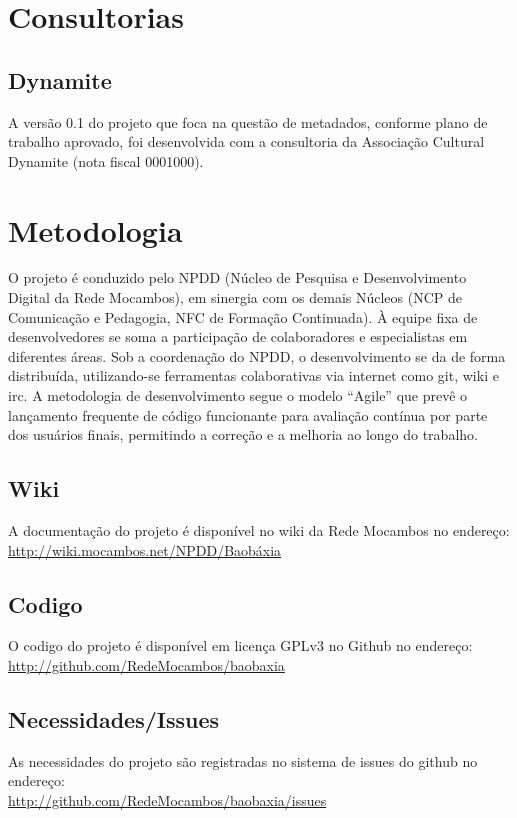 \section{Consultorias}
\subsection{Dynamite}
A versão 0.1 do projeto que foca na questão de metadados, conforme
plano de trabalho aprovado, foi desenvolvida com a consultoria da
Associação Cultural Dynamite (nota fiscal 0001000).


\section{Metodologia}
O projeto é conduzido pelo NPDD (Núcleo de Pesquisa e Desenvolvimento
Digital da Rede Mocambos), em sinergia com os demais Núcleos (NCP de
Comunicação e Pedagogia, NFC de Formação Continuada). À equipe fixa de
desenvolvedores se soma a participação de colaboradores e
especialistas em diferentes áreas. Sob a coordenação do NPDD, o
desenvolvimento se da de forma distribuída, utilizando-se ferramentas
colaborativas via internet como git, wiki e irc. A metodologia de
desenvolvimento segue o modelo ``Agile'' que prevê o lançamento
frequente de código funcionante para avaliação contínua por parte dos
usuários finais, permitindo a correção e a melhoria ao longo do
trabalho.

\subsection{Wiki}
A documentação do projeto é disponível no wiki da Rede Mocambos no
endereço: \\ \url{http://wiki.mocambos.net/NPDD/Baobáxia}

\subsection{Codigo}
O codigo do projeto é disponível em licença GPLv3 no Github no
endereço: \\ \url{http://github.com/RedeMocambos/baobaxia}

\subsection{Necessidades/Issues}
As necessidades do projeto são registradas no sistema de issues do
github no endereço:
\\ \url{http://github.com/RedeMocambos/baobaxia/issues}

